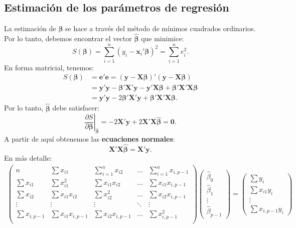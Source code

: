 \documentclass[
]{article}
\begin{document}
\hypertarget{estimaciuxf3n-de-los-paruxe1metros-de-regresiuxf3n}{%
\subsection{Estimación de los parámetros de regresión}\label{estimaciuxf3n-de-los-paruxe1metros-de-regresiuxf3n}}

La estimación de \(\boldsymbol \beta\) se hace a través del método de mínimos cuadrados ordinarios. Por lo tanto, debemos encontrar el vector \(\widehat{\boldsymbol \beta}\) que minimice:
\[
S(\boldsymbol \beta) =  \sum_{i=1}^{n}\left(y_{i} - \boldsymbol x_{i}'\boldsymbol \beta\right)^2 = \sum_{i=1}^{n}e_{i}^2.
\]
En forma matricial, tenemos:
\begin{equation}
\begin{split}
S(\boldsymbol \beta) &= \boldsymbol e'\boldsymbol e= (\boldsymbol y- \boldsymbol X\boldsymbol \beta)'(\boldsymbol y- \boldsymbol X\boldsymbol \beta) \\
&= \boldsymbol y'\boldsymbol y- \boldsymbol \beta'\boldsymbol X'\boldsymbol y- \boldsymbol y'\boldsymbol X\boldsymbol \beta+ \boldsymbol \beta'\boldsymbol X'\boldsymbol X\boldsymbol \beta\\
&= \boldsymbol y'\boldsymbol y- 2\boldsymbol \beta'\boldsymbol X'\boldsymbol y+ \boldsymbol \beta'\boldsymbol X'\boldsymbol X\boldsymbol \beta.
\end{split}
\nonumber
\end{equation}
Por lo tanto, \(\widehat{\boldsymbol \beta}\) debe satisfacer:
\[
\left. \frac{\partial S}{\partial \boldsymbol \beta} \right|_{\widehat{\boldsymbol \beta}} = - 2\boldsymbol X'\boldsymbol y+ 2\boldsymbol X'\boldsymbol X\widehat{\boldsymbol \beta}= \boldsymbol 0.
\]
A partir de aquí obtenemos las \textbf{ecuaciones normales}:
\[
\boldsymbol X'\boldsymbol X\widehat{\boldsymbol \beta}= \boldsymbol X'\boldsymbol y.
\]
En más detalle:
\begin{gather}
\begin{pmatrix}
n & \sum x_{i1} & \sum_{i=1}^{n}x_{i2} & \ldots & \sum_{i=1}^{n}x_{i,p-1} \\
\sum x_{i1} & \sum x_{i1}^2 & \sum x_{i1}x_{i2} & \ldots & \sum x_{i1}x_{i,p-1} \\
\sum x_{i2} & \sum x_{i1}x_{i2} & \sum x_{i2}^2 & \ldots & \sum x_{i2}x_{i,p-1} \\
\vdots & \vdots & \vdots & \ddots & \vdots \\
\sum x_{i,p-1} & \sum x_{i1}x_{i,p-1} & \sum x_{i2}x_{i,p-1} & \ldots & \sum x_{i,p-1}^{2} \\
\end{pmatrix} \begin{pmatrix}
\widehat{\beta}_{0} \\ \widehat{\beta}_{1} \\ \vdots \\ \widehat{\beta}_{p-1} \end{pmatrix} = \begin{pmatrix}
\sum y_{i} \\ \sum x_{i1}y_{i} \\ \vdots \\ \sum x_{i,p-1}y_{i}
\end{pmatrix}
\nonumber
\end{gather}
\end{document}
